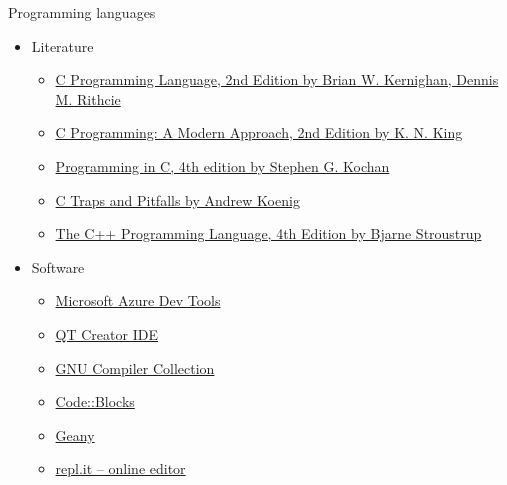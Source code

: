 \documentclass[usenames,dvipsnames,aspectratio=169]{beamer}
\newcommand{\hiv}[1]{{\color{hivatkozasszin}#1}}
\begin{document}
\begin{frame}{Programming languages}
  \begin{itemize}
    \item Literature
    \begin{itemize}
      \item \hiv{\href{https://www.amazon.com/Programming-Language-2nd-Brian-Kernighan/dp/0131103628}{C Programming Language, 2nd Edition by Brian W. Kernighan, Dennis M. Rithcie}}
      \item \hiv{\href{https://www.amazon.com/C-Programming-Modern-Approach-2nd/dp/0393979504}{C Programming: A Modern Approach, 2nd Edition by K. N. King}}
      \item \hiv{\href{https://www.amazon.com/Programming-C-4th-Developers-Library/dp/0321776410}{Programming in C, 4th edition by Stephen G. Kochan}}
      \item \hiv{\href{https://www.amazon.com/C-Traps-Pitfalls-Andrew-Koenig/dp/0201179288}{C Traps and Pitfalls by Andrew Koenig}}
      \item \hiv{\href{https://www.amazon.com/gp/product/0321958322/ref=dbs_a_def_rwt_bibl_vppi_i3}
        {The C++ Programming Language, 4th Edition by Bjarne Stroustrup}}
    \end{itemize}
    \item Software
    \begin{itemize}
      \item \hiv{\href{https://azureforeducation.microsoft.com/devtools}{Microsoft Azure Dev Tools}}
      \item \hiv{\href{https://www.qt.io/qt-features-libraries-apis-tools-and-ide/\#ide}{QT Creator IDE}}
      \item \hiv{\href{https://gcc.gnu.org/}{GNU Compiler Collection}}
      \item \hiv{\href{http://www.codeblocks.org/}{Code::Blocks}}
      \item \hiv{\href{https://www.geany.org/}{Geany}}
      \item \hiv{\href{https://repl.it/}{repl.it -- online editor}}
    \end{itemize}
  \end{itemize}
\end{frame}
\end{document}

